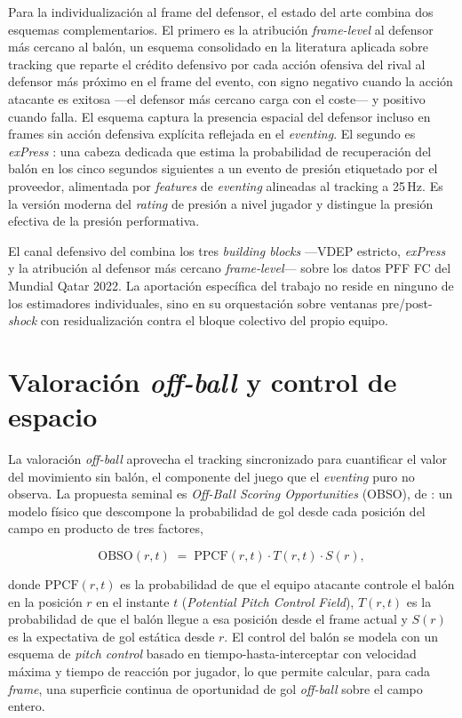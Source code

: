 Para la individualización al frame del defensor, el estado del arte
combina dos esquemas complementarios. El primero es la atribución
\textit{frame-level} al defensor más cercano al balón, un esquema
consolidado en la literatura aplicada sobre tracking que reparte el
crédito defensivo por cada acción ofensiva del rival al defensor más
próximo en el frame del evento, con signo negativo cuando la acción
atacante es exitosa ---el defensor más cercano carga con el coste---
y positivo cuando falla. El esquema captura la presencia espacial del
defensor incluso en frames sin acción defensiva explícita reflejada en
el \textit{eventing}. El segundo es \textit{exPress}
\parencite{Lee2025exPress}: una
cabeza dedicada que estima la probabilidad de recuperación del balón
en los cinco segundos siguientes a un evento de presión etiquetado por
el proveedor, alimentada por \textit{features} de \textit{eventing}
alineadas al tracking a 25\,Hz. Es la versión moderna del
\textit{rating} de presión a nivel jugador y distingue la presión
efectiva de la presión performativa.

El canal defensivo del \CCV combina los tres \textit{building blocks}
---VDEP estricto, \textit{exPress} y la atribución al defensor más
cercano \textit{frame-level}--- sobre los datos PFF FC del Mundial
Qatar 2022. La aportación específica del
trabajo no reside en ninguno de los estimadores individuales, sino en
su orquestación sobre ventanas pre/post-\textit{shock} con
residualización contra el bloque colectivo del propio equipo.


\section{Valoración \textit{off-ball} y control de espacio}
\label{sec:sota-offball}

La valoración \textit{off-ball} aprovecha el tracking sincronizado para
cuantificar el valor del movimiento sin balón, el componente del juego
que el \textit{eventing} puro no observa. La propuesta seminal es
\textit{Off-Ball Scoring Opportunities} (OBSO), de
\textcite{Spearman2018OBSO}: un modelo físico que descompone la
probabilidad de gol desde cada posición del campo en producto de tres
factores,

\[
\text{OBSO}(r, t) \;=\; \text{PPCF}(r, t) \cdot T(r, t) \cdot S(r),
\]

donde $\text{PPCF}(r, t)$ es la probabilidad de que el equipo atacante
controle el balón en la posición $r$ en el instante $t$ (\textit{Potential
Pitch Control Field}), $T(r, t)$ es la probabilidad de que el balón
llegue a esa posición desde el frame actual y $S(r)$ es la expectativa
de gol estática desde $r$. El control del balón se modela con un
esquema de \textit{pitch control} basado en tiempo-hasta-interceptar
con velocidad máxima y tiempo de reacción por jugador, lo que permite
calcular, para cada \textit{frame}, una superficie continua de
oportunidad de gol \textit{off-ball} sobre el campo entero.

